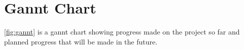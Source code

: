 \chapter{Gannt Chart}
\ref{fig:gannt} is a gannt chart showing progress made on the project so far and planned progress that will be made in the future.
